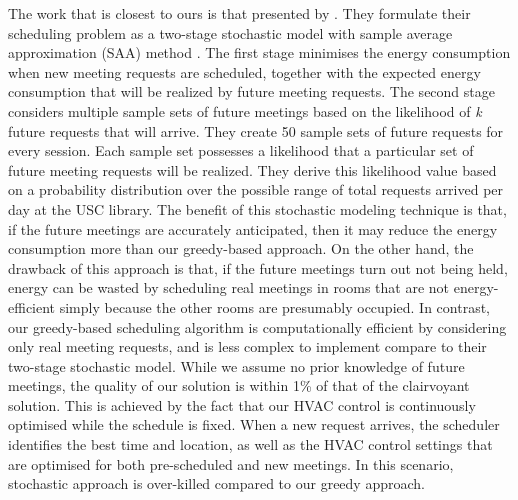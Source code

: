 The work that is closest to ours is that presented by \cite{kwak2013tesla}. They formulate their scheduling problem as a two-stage stochastic model with sample average approximation (SAA) method \citep{pagnoncelli2009sample}. The first stage minimises the energy consumption when new meeting requests are scheduled, together with the expected energy consumption that will be realized by future meeting requests. The second stage considers multiple sample sets of future meetings based on the likelihood of \emph{\textsl{k}} future requests that will arrive. They create 50 sample sets of future requests for every session. Each sample set possesses a likelihood that a particular set of future meeting requests will be realized. They derive this likelihood value based on a probability distribution over the possible range of total requests arrived per day at the USC library. 
The benefit of this stochastic modeling technique is that, if the future meetings are accurately anticipated, then it may reduce the energy consumption more than our greedy-based approach.
On the other hand, the drawback of this approach is that, if the future meetings turn out not being held, energy can be wasted by scheduling real meetings in rooms that are not energy-efficient simply because the other rooms are presumably occupied. 
In contrast, our greedy-based scheduling algorithm is computationally efficient by considering only real meeting requests, and is less complex to implement compare to their two-stage stochastic model. While we assume no prior knowledge of future meetings, the quality of our solution is within 1\% of that of the clairvoyant solution. This is achieved by the fact that our HVAC control is continuously optimised while the schedule is fixed. When a new request arrives, the scheduler identifies the best time and location, as well as the HVAC control settings that are optimised for both pre-scheduled and new meetings. In this scenario, stochastic approach is over-killed compared to our greedy approach.


